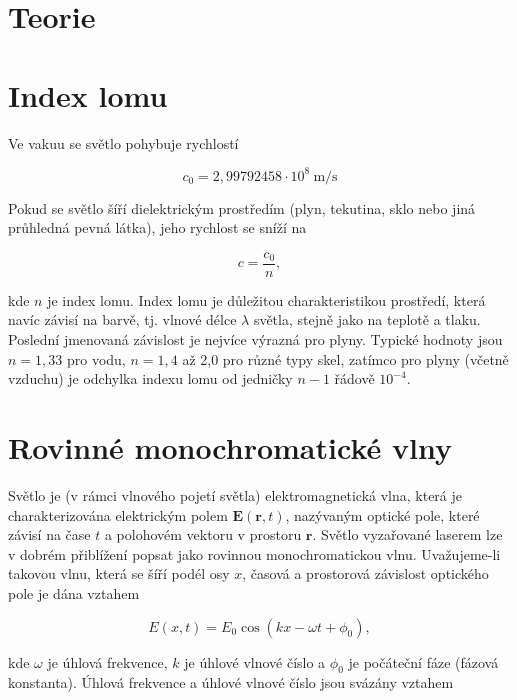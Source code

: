 \documentclass[czech,11pt,a4paper]{article}
\begin{document}
	\begin{multicols}{2}
		
	
	\section{Teorie}
	\section*{Index lomu}
	Ve vakuu se světlo pohybuje rychlostí
	
	\begin{equation}
		c_{0}=2,99792458 \cdot 10^{8} \mathrm{~m} / \mathrm{s}
	\end{equation}
	
	
	Pokud se světlo šíří dielektrickým prostředím (plyn, tekutina, sklo nebo jiná průhledná pevná látka), jeho rychlost se sníží na
	
	
	\begin{equation}
		c=\frac{c_{0}}{n},
	\end{equation}
	
	
	kde $n$ je index lomu. Index lomu je důležitou charakteristikou prostředí, která navíc závisí na barvě, tj. vlnové délce $\lambda$ světla, stejně jako na teplotě a tlaku. Poslední jmenovaná závislost je nejvíce výrazná pro plyny. Typické hodnoty jsou $n=1,33$ pro vodu, $n=1,4$ až 2,0 pro různé typy skel, zatímco pro plyny (včetně vzduchu) je odchylka indexu lomu od jedničky $n-1$ řádově $10^{-4}$.
	
	\section*{Rovinné monochromatické vlny}
	Světlo je (v rámci vlnového pojetí světla) elektromagnetická vlna, která je charakterizována elektrickým polem $\boldsymbol{E}(\boldsymbol{r}, t)$, nazývaným optické pole, které závisí na čase $t$ a polohovém vektoru v prostoru $\boldsymbol{r}$. Světlo vyzařované laserem lze v dobrém přiblížení popsat jako rovinnou monochromatickou vlnu. Uvažujeme-li takovou vlnu, která se šíří podél osy $x$, časová a prostorová závislost optického pole je dána vztahem
	
	\begin{equation}
		E(x, t)=E_{0} \cos \left(k x-\omega t+\phi_{0}\right),
	\end{equation}
	
	
	kde $\omega$ je úhlová frekvence, $k$ je úhlové vlnové číslo a $\phi_{0}$ je počáteční fáze (fázová konstanta). Úhlová frekvence a úhlové vlnové číslo jsou svázány vztahem
	

\end{multicols}
\end{document}
